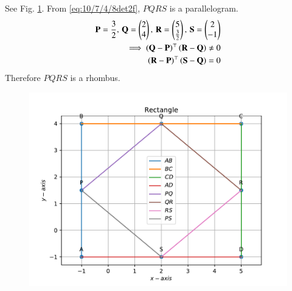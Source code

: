 \solution 
See Fig. \ref{fig:10/7/4/8Fig3}. From 
  \eqref{eq:10/7/4/8det2f}, $PQRS$ is a parallelogram.
\begin{align}
  \mathbf{P}  = 
 \frac{3}{2},\, 
 \mathbf{Q}  = \begin{pmatrix}
 2 \\
 4 \\
 \end{pmatrix} ,\,
 \mathbf{R}  = \begin{pmatrix}
 5 \\
 \frac{3}{2}
 \end{pmatrix}   
  ,\,
 \mathbf{S}  = \begin{pmatrix}
 2\\
 -1 \\
 \end{pmatrix}   
 \\
	\implies 
 \left(\mathbf{Q}-\mathbf{P}\right)^\top\left(\mathbf{R}-\mathbf{Q}\right)  \neq 0
 \\
 \left(\mathbf{R}-\mathbf{P}\right)^\top\left(\mathbf{S}-\mathbf{Q}\right)  = 0
\end{align}
Therefore $PQRS$ is a rhombus.
\begin{figure}[!h]
	\begin{center}
		\includegraphics[width=\columnwidth]{chapters/10/7/4/8/figs/problem1.pdf}
	\end{center}
\caption{}
\label{fig:10/7/4/8Fig3}
\end{figure}

